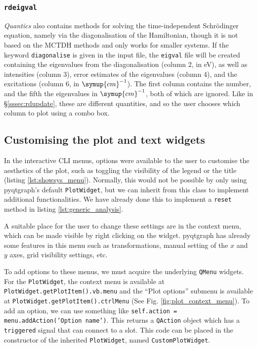 \documentclass[12pt]{article}
\begin{document}
\subsubsection{\texttt{rdeigval}}\label{sssec:rdeigval}

\textit{Quantics} also contains methods for solving the time-independent Schr\"odinger equation, namely via the diagonalisation of the Hamiltonian, though it is not based on the MCTDH methods and only works for smaller systems. If the keyword \texttt{diagonalise} is given in the input file, the \texttt{eigval} file will be created containing the eigenvalues from the diagonalisation (column 2, in eV), as well as intensities (column 3), error estimates of the eigenvalues (column 4), and the excitations (column 6, in \(\symup{cm}^{-1}\)). The first column contains the number, and the fifth the eigenvalues in \(\symup{cm}^{-1}\), both of which are ignored. Like in \S\ref{sssec:rdupdate}, these are different quantities, and so the user chooses which column to plot using a combo box.

\subsection{Customising the plot and text widgets}\label{ssec:customising}

In the interactive CLI menus, options were available to the user to customise the aesthetics of the plot, such as toggling the visibility of the legend or the title (listing \ref{lst:showsys_menu}). Normally, this would not be possible by only using pyqtgraph's default \texttt{PlotWidget}, but we can inherit from this class to implement additional functionalities. We have already done this to implement a \texttt{reset} method in listing \ref{lst:generic_analysis}.

A suitable place for the user to change these settings are in the context menu, which can be made visible by right clicking on the widget. pyqtgraph has already some features in this menu such as transformations, manual setting of the \(x\) and \(y\) axes, grid visibility settings, etc.

To add options to these menus, we must acquire the underlying \texttt{QMenu} widgets. For the \texttt{PlotWidget}, the context menu is available at \texttt{PlotWidget.getPlotItem().vb.menu} and the ``Plot options'' submenu is available at \texttt{PlotWidget.getPlotItem().ctrlMenu} (See Fig. \ref{fig:plot_context_menu}). To add an option, we can use something like \texttt{self.action = menu.addAction('Option name')}. This returns a \texttt{QAction} object which has a \texttt{triggered} signal that can connect to a slot. This code can be placed in the constructor of the inherited \texttt{PlotWidget}, named \texttt{CustomPlotWidget}.
\end{document}
